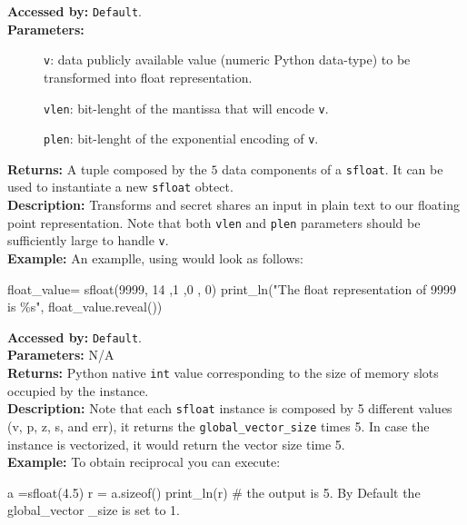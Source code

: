 \begin{mylisting}
		      \textbf{Accessed by:} \verb|Default|. \\
		      \textbf{Parameters:}
		      \begin{description}
			     \item[]\verb|v|: data publicly available value (numeric Python data-type) to be transformed into float representation.
			     \item[]\verb|vlen|: bit-lenght of the mantissa that will encode \verb|v|.
			     \item[]\verb|plen|: bit-lenght of the exponential encoding of \verb|v|.
		      \end{description}
		      \textbf{Returns:} A tuple composed by the $5$ data components of a \verb|sfloat|. 
		      It can be used to instantiate a new \verb|sfloat| obtect.\\
		      \textbf{Description:} Transforms and secret shares an input 
		      in plain text to our floating point representation. 
		      Note that both \verb|vlen| and \verb|plen| parameters should 
		      be sufficiently large to handle \verb|v|.\\
		\textbf{Example:}
		An examplle, using  would look as follows:
		\begin{mylisting}
		   float_value= sfloat(9999, 14 ,1 ,0 , 0) 
	 	   print_ln("The float representation of 9999 is \%s", float_value.reveal())		
		\end{mylisting}
                        \textbf{Accessed by:} \verb|Default|. \\
                        \textbf{Parameters:} N/A \\
                        \textbf{Returns:}
                                 Python native \verb|int| value corresponding to the size of 
                                 memory slots occupied by the instance. \\
                        \textbf{Description:}
                                Note that each \verb|sfloat| instance is composed by 5 
                                different values (v, p, z, s, and err), 
                                it returns the \verb|global_vector_size| times 5. 
                                In case the instance is vectorized, 
                                it would return the vector size time 5.\\
                \textbf{Example:}
                    To obtain reciprocal you can execute:
                        \begin{mylisting}
                                a =sfloat(4.5)
                                r = a.sizeof()
                                print_ln(r)  # the output is 5. By Default the global_vector
                                _size is set to 1.
                        \end{mylisting}
                        

\end{mylisting}
